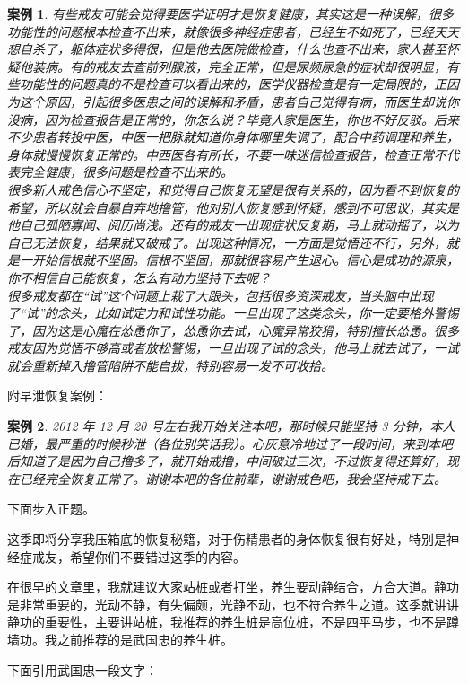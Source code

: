 \documentclass[fontset=founder]{ctexart}
\newtheorem{case}{案例}
\begin{document}
\begin{case}
    有些戒友可能会觉得要医学证明才是恢复健康，其实这是一种误解，很多功能性的问题根本检查不出来，就像很多神经症患者，已经生不如死了，已经天天想自杀了，躯体症状多得很，但是他去医院做检查，什么也查不出来，家人甚至怀疑他装病。有的戒友去查前列腺液，完全正常，但是尿频尿急的症状却很明显，有些功能性的问题真的不是检查可以看出来的，医学仪器检查是有一定局限的，正因为这个原因，引起很多医患之间的误解和矛盾，患者自己觉得有病，而医生却说你没病，因为检查报告是正常的，你怎么说？毕竟人家是医生，你也不好反驳。后来不少患者转投中医，中医一把脉就知道你身体哪里失调了，配合中药调理和养生，身体就慢慢恢复正常的。中西医各有所长，不要一味迷信检查报告，检查正常不代表完全健康，很多问题是检查不出来的。\\
    很多新人戒色信心不坚定，和觉得自己恢复无望是很有关系的，因为看不到恢复的希望，所以就会自暴自弃地撸管，他对别人恢复感到怀疑，感到不可思议，其实是他自己孤陋寡闻、阅历尚浅。还有的戒友一出现症状反复期，马上就动摇了，以为自己无法恢复，结果就又破戒了。出现这种情况，一方面是觉悟还不行，另外，就是一开始信根就不坚固。信根不坚固，那就很容易产生退心。信心是成功的源泉，你不相信自己能恢复，怎么有动力坚持下去呢？\\
    很多戒友都在“试”这个问题上栽了大跟头，包括很多资深戒友，当头脑中出现了“试”的念头，比如试定力和试性功能。一旦出现了这类念头，你一定要格外警惕了，因为这是心魔在怂恿你了，怂恿你去试，心魔异常狡猾，特别擅长怂恿。很多戒友因为觉悟不够高或者放松警惕，一旦出现了试的念头，他马上就去试了，一试就会重新掉入撸管陷阱不能自拔，特别容易一发不可收拾。
\end{case}

附早泄恢复案例：

\begin{case}
    2012 年 12 月 20 号左右我开始关注本吧，那时候只能坚持 3 分钟，本人已婚，最严重的时候秒泄（各位别笑话我）。心灰意冷地过了一段时间，来到本吧后知道了是因为自己撸多了，就开始戒撸，中间破过三次，不过恢复得还算好，现在已经完全恢复正常了。谢谢本吧的各位前辈，谢谢戒色吧，我会坚持戒下去。
\end{case}

下面步入正题。

这季即将分享我压箱底的恢复秘籍，对于伤精患者的身体恢复很有好处，特别是神经症戒友，希望你们不要错过这季的内容。

在很早的文章里，我就建议大家站桩或者打坐，养生要动静结合，方合大道。静功是非常重要的，光动不静，有失偏颇，光静不动，也不符合养生之道。这季就讲讲静功的重要性，主要讲站桩，我推荐的养生桩是高位桩，不是四平马步，也不是蹲墙功。我之前推荐的是武国忠的养生桩。

下面引用武国忠一段文字：
\end{document}
